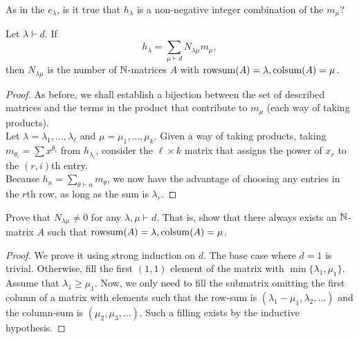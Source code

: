 	As in the $e_\lambda$, is it true that $h_\lambda$ is a non-negative integer combination of the $m_\mu$?
	\begin{flem}
		Let $\lambda \vdash d$. If
		\[ h_\lambda = \sum_{\mu \vdash d} N_{\lambda\mu} m_\mu, \]
		then $N_{\lambda\mu}$ is the number of $\mathbb{N}$-matrices $A$ with $\operatorname{rowsum}(A) = \lambda, \operatorname{colsum}(A) = \mu$.
	\end{flem}
	\begin{proof}
		As before, we shall establish a bijection between the set of described matrices and the terms in the product that contribute to $m_\mu$ (each way of taking products).\\
		Let $\lambda = \lambda_1,\ldots,\lambda_\ell$ and $\mu = \mu_1,\ldots,\mu_k$. Given a way of taking products, taking $m_{\theta_i} = \sum x^{\theta_i}$ from $h_{\lambda_i}$, consider the $\ell \times k$ matrix that assigns the power of $x_r$ to the $(r,i)$th entry.\\ 
		Because $h_n = \sum_{\theta \vdash n} m_\theta$, we now have the advantage of choosing any entries in the $r$th row, as long as the sum is $\lambda_r$.
	\end{proof}


	\begin{prop}
		Prove that $N_{\lambda\mu} \ne 0$ for any $\lambda,\mu \vdash d$. That is, show that there always exists an $\mathbb{N}$-matrix $A$ such that $\operatorname{rowsum}(A) = \lambda,\operatorname{colsum}(A) = \mu$.
	\end{prop}
	\begin{proof}
		We prove it using strong induction on $d$. The base case where $d = 1$ is trivial. Otherwise, fill the first $(1,1)$ element of the matrix with $\min\{\lambda_1,\mu_1\}$. Assume that $\lambda_1 \ge \mu_1$. Now, we only need to fill the submatrix omitting the first column of a matrix with elements such that the row-sum is $(\lambda_1-\mu_1,\lambda_2,\ldots)$ and the column-sum is $(\mu_2,\mu_3,\ldots)$. Such a filling exists by the inductive hypothesis.
	\end{proof}

